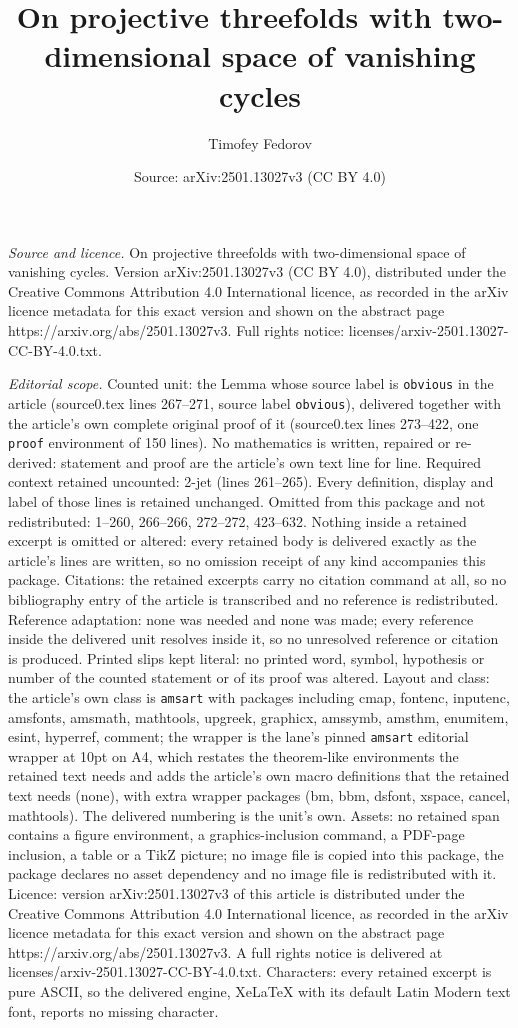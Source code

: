 \documentclass[10pt,a4paper]{amsart}
\title[On projective threefolds with two-dimensional space of vanis]{On projective threefolds with two-dimensional space of vanishing cycles}
\author{Timofey Fedorov}
\date{Source: arXiv:2501.13027v3 (CC BY 4.0)}
\begin{document}
\maketitle

\noindent\emph{Source and licence.} On projective threefolds with two-dimensional space of vanishing cycles. Version arXiv:2501.13027v3 (CC BY 4.0), distributed under the Creative Commons Attribution 4.0 International licence, as recorded in the arXiv licence metadata for this exact version and shown on the abstract page https://arxiv.org/abs/2501.13027v3. Full rights notice: licenses/arxiv-2501.13027-CC-BY-4.0.txt.\par\smallskip

\noindent\textit{Editorial scope.} Counted unit: the Lemma whose source label is \texttt{obvious} in the article (source0.tex lines 267--271, source label \texttt{obvious}), delivered together with the article's own complete original proof of it (source0.tex lines 273--422, one \texttt{proof} environment of 150 lines). No mathematics is written, repaired or re-derived: statement and proof are the article's own text line for line. Required context retained uncounted: 2-jet (lines 261--265). Every definition, display and label of those lines is retained unchanged. Omitted from this package and not redistributed: 1--260, 266--266, 272--272, 423--632. Nothing inside a retained excerpt is omitted or altered: every retained body is delivered exactly as the article's lines are written, so no omission receipt of any kind accompanies this package. Citations: the retained excerpts carry no citation command at all, so no bibliography entry of the article is transcribed and no reference is redistributed. Reference adaptation: none was needed and none was made; every reference inside the delivered unit resolves inside it, so no unresolved reference or citation is produced. Printed slips kept literal: no printed word, symbol, hypothesis or number of the counted statement or of its proof was altered. Layout and class: the article's own class is \texttt{amsart} with packages including cmap, fontenc, inputenc, amsfonts, amsmath, mathtools, upgreek, graphicx, amssymb, amsthm, enumitem, esint, hyperref, comment; the wrapper is the lane's pinned \texttt{amsart} editorial wrapper at 10pt on A4, which restates the theorem-like environments the retained text needs and adds the article's own macro definitions that the retained text needs (none), with extra wrapper packages (bm, bbm, dsfont, xspace, cancel, mathtools). The delivered numbering is the unit's own. Assets: no retained span contains a figure environment, a graphics-inclusion command, a PDF-page inclusion, a table or a TikZ picture; no image file is copied into this package, the package declares no asset dependency and no image file is redistributed with it. Licence: version arXiv:2501.13027v3 of this article is distributed under the Creative Commons Attribution 4.0 International licence, as recorded in the arXiv licence metadata for this exact version and shown on the abstract page https://arxiv.org/abs/2501.13027v3. A full rights notice is delivered at licenses/arxiv-2501.13027-CC-BY-4.0.txt. Characters: every retained excerpt is pure ASCII, so the delivered engine, XeLaTeX with its default Latin Modern text font, reports no missing character.
\end{document}

